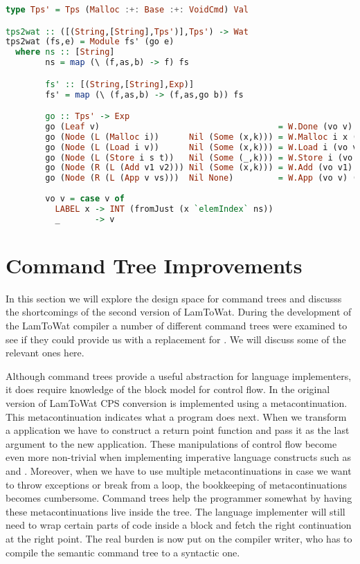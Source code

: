 \begin{lstlisting}[language=Haskell]
type Tps' = Tps (Malloc :+: Base :+: VoidCmd) Val

tps2wat :: ([(String,[String],Tps')],Tps') -> Wat
tps2wat (fs,e) = Module fs' (go e)
  where ns :: [String]
        ns = map (\ (f,as,b) -> f) fs

        fs' :: [(String,[String],Exp)]
        fs' = map (\ (f,as,b) -> (f,as,go b)) fs

        go :: Tps' -> Exp
        go (Leaf v)                                    = W.Done (vo v)
        go (Node (L (Malloc i))      Nil (Some (x,k))) = W.Malloc i x (go k)
        go (Node (L (Load i v))      Nil (Some (x,k))) = W.Load i (vo v) x (go k)
        go (Node (L (Store i s t))   Nil (Some (_,k))) = W.Store i (vo s) (vo t) (go k)
        go (Node (R (L (Add v1 v2))) Nil (Some (x,k))) = W.Add (vo v1) (vo v2) x (go k)
        go (Node (R (L (App v vs)))  Nil None)         = W.App (vo v) (map vo vs)
        
        vo v = case v of
          LABEL x -> INT (fromJust (x `elemIndex` ns))
          _       -> v
\end{lstlisting}

\section{\label{section:commandtrees}Command Tree Improvements}
In this section we will explore the design space for command trees and discusss the shortcomings of the second version of LamToWat. During the development of the LamToWat compiler a number of different command trees were examined to see if they could provide us with a replacement for . We will discuss some of the relevant ones here.

Although command trees provide a useful abstraction for language implementers, it does require knowledge of the block model for control flow. In the original version of LamToWat CPS conversion is implemented using a metacontinuation. This metacontinuation indicates what a program does next. When we transform a application we have to construct a return point function and pass it as the last argument to the new application. These manipulations of control flow become even more non-trivial when implementing imperative language constructs such as  and . Moreover, when we have to use multiple metacontinuations in case we want to throw exceptions or break from a  loop, the bookkeeping of metacontinuations becomes cumbersome. Command trees help the programmer somewhat by having these metacontinuations live inside the tree. The language implementer will still need to wrap certain parts of code inside a block and fetch the right continuation at the right point. The real burden is now put on the compiler writer, who has to compile the semantic command tree to a syntactic one.

